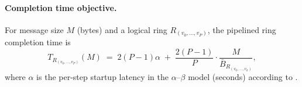 \documentclass[12pt]{article}
\newtheorem{problem}{Problem}
\begin{document}




\paragraph{Completion time objective.}
For message size $M$ (bytes) and a logical ring $R_(v_0,\dots,v_P)$, the pipelined ring completion time is
\begin{equation}
T_{R_(v_0,\dots,v_P)}(M)
\;=\; 2(P-1)\alpha \;+\; \frac{2(P-1)}{P}\cdot\frac{M}{\bar{B}_{R_(v_0,\dots,v_k)}},
\label{eq:ring-time-k}
\end{equation}
where $\alpha$ is the per-step startup latency in the $\alpha$–$\beta$ model (seconds) according to \cite{thakur2005collectives,sergeev2018horovod}.


\end{document}
